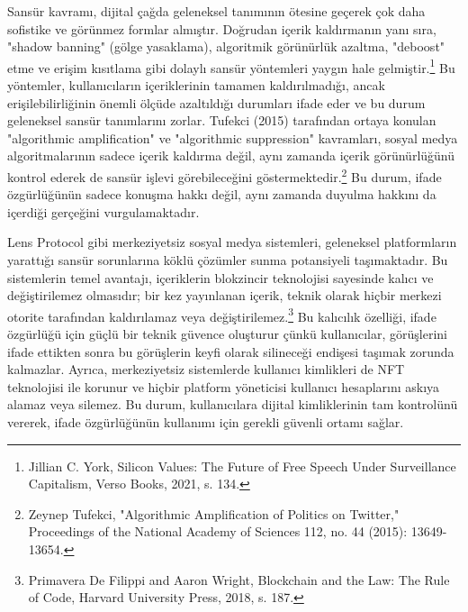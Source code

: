 \documentclass[11pt,a4paper]{article}
\begin{document}
Sansür kavramı, dijital çağda geleneksel tanımının ötesine geçerek çok daha sofistike ve görünmez formlar almıştır. Doğrudan içerik kaldırmanın yanı sıra, "shadow banning" (gölge yasaklama), algoritmik görünürlük azaltma, "deboost" etme ve erişim kısıtlama gibi dolaylı sansür yöntemleri yaygın hale gelmiştir.\footnote{Jillian C. York, Silicon Values: The Future of Free Speech Under Surveillance Capitalism, Verso Books, 2021, s. 134.} Bu yöntemler, kullanıcıların içeriklerinin tamamen kaldırılmadığı, ancak erişilebilirliğinin önemli ölçüde azaltıldığı durumları ifade eder ve bu durum geleneksel sansür tanımlarını zorlar. Tufekci (2015) tarafından ortaya konulan "algorithmic amplification" ve "algorithmic suppression" kavramları, sosyal medya algoritmalarının sadece içerik kaldırma değil, aynı zamanda içerik görünürlüğünü kontrol ederek de sansür işlevi görebileceğini göstermektedir.\footnote{Zeynep Tufekci, "Algorithmic Amplification of Politics on Twitter," Proceedings of the National Academy of Sciences 112, no. 44 (2015): 13649-13654.} Bu durum, ifade özgürlüğünün sadece konuşma hakkı değil, aynı zamanda duyulma hakkını da içerdiği gerçeğini vurgulamaktadır.

Lens Protocol gibi merkeziyetsiz sosyal medya sistemleri, geleneksel platformların yarattığı sansür sorunlarına köklü çözümler sunma potansiyeli taşımaktadır. Bu sistemlerin temel avantajı, içeriklerin blokzincir teknolojisi sayesinde kalıcı ve değiştirilemez olmasıdır; bir kez yayınlanan içerik, teknik olarak hiçbir merkezi otorite tarafından kaldırılamaz veya değiştirilemez.\footnote{Primavera De Filippi and Aaron Wright, Blockchain and the Law: The Rule of Code, Harvard University Press, 2018, s. 187.} Bu kalıcılık özelliği, ifade özgürlüğü için güçlü bir teknik güvence oluşturur çünkü kullanıcılar, görüşlerini ifade ettikten sonra bu görüşlerin keyfi olarak silineceği endişesi taşımak zorunda kalmazlar. Ayrıca, merkeziyetsiz sistemlerde kullanıcı kimlikleri de NFT teknolojisi ile korunur ve hiçbir platform yöneticisi kullanıcı hesaplarını askıya alamaz veya silemez. Bu durum, kullanıcılara dijital kimliklerinin tam kontrolünü vererek, ifade özgürlüğünün kullanımı için gerekli güvenli ortamı sağlar.
\end{document}
